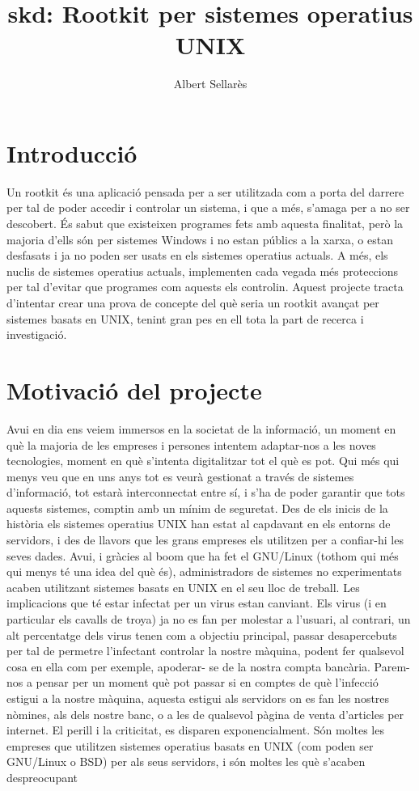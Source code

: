 \documentclass[a4paper]{article}
\author{Albert Sellarès}
\title{skd: Rootkit per sistemes operatius UNIX}
\begin{document}
\maketitle
\newpage


\section{Introducció}

Un rootkit és una aplicació pensada per a ser utilitzada com a porta del darrere per tal de
poder accedir i controlar un sistema, i que a més, s'amaga per a no ser descobert.
És sabut que existeixen programes fets amb aquesta finalitat, però la majoria d'ells són
per sistemes Windows i no estan públics a la xarxa, o estan desfasats i ja no poden ser
usats en els sistemes operatius actuals.
A més, els nuclis de sistemes operatius actuals, implementen cada vegada més
proteccions per tal d'evitar que programes com aquests els controlin.
Aquest projecte tracta d'intentar crear una prova de concepte del què seria un rootkit
avançat per sistemes basats en UNIX, tenint gran pes en ell tota la part de recerca i
investigació.

\section{Motivació del projecte}

Avui en dia ens veiem immersos en la societat de la informació, un moment en què la
majoria de les empreses i persones intentem adaptar-nos a les noves tecnologies,
moment en què s'intenta digitalitzar tot el què es pot.
Qui més qui menys veu que en uns anys tot es veurà gestionat a través de sistemes
d'informació, tot estarà interconnectat entre sí, i s'ha de poder garantir que tots aquests
sistemes, comptin amb un mínim de seguretat.
Des de els inicis de la història els sistemes operatius UNIX han estat al capdavant en els
entorns de servidors, i des de llavors que les grans empreses els utilitzen per a confiar-hi
les seves dades. Avui, i gràcies al boom que ha fet el GNU/Linux (tothom qui més qui
menys té una idea del què és), administradors de sistemes no experimentats acaben
utilitzant sistemes basats en UNIX en el seu lloc de treball.
Les implicacions que té estar infectat per un virus estan canviant. Els virus (i en particular
els cavalls de troya) ja no es fan per molestar a l'usuari, al contrari, un alt percentatge dels
virus tenen com a objectiu principal, passar desapercebuts per tal de permetre l'infectant
controlar la nostre màquina, podent fer qualsevol cosa en ella com per exemple, apoderar-
se de la nostra compta bancària.
Parem-nos a pensar per un moment què pot passar si en comptes de què l'infecció estigui
a la nostre màquina, aquesta estigui als servidors on es fan les nostres nòmines, als dels
nostre banc, o a les de qualsevol pàgina de venta d'articles per internet. El perill i la
criticitat, es disparen exponencialment.
Són moltes les empreses que utilitzen sistemes operatius basats en UNIX (com poden ser
GNU/Linux o BSD) per als seus servidors, i són moltes les què s'acaben despreocupant
\end{document}
